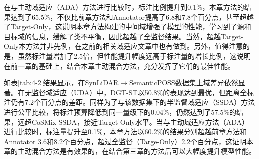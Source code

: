     在与主动域适应（ADA）方法进行比较时，标注比例提升到0.1\%，本章方法的结果达到了65.5\%，不仅比前章方法和Annotator提高了6.8和7.8个百分点，甚至超越了Target-Only，这说明本章方法构建的中间域增强了模型的性能，学习到了源和目标域的信息，缓解了类不平衡，因此超越了全监督结果。当然，超越Target-Only本方法并非先例，在之前的相关域适应文章中也有做到。另外，值得注意的是，虽然标注量增加了2.5倍，但性能提升幅度远高于标注量的增长比例，这说明在前一章的基础上，结合本章主动混合方法，充分发挥了它们的最佳性能。
    
    
    如表\ref{tab:4-2}结果显示，在SynLiDAR$\to$SemanticPOSS数据集上域差异依然显著。在无监督域适应（UDA）中，DGT-ST以50.8\%的表现达到最优，但距离全标注仍有7.2个百分点的差距。同样为了与该数据集下的半监督域适应（SSDA）方法进行公平比较，将标注预算降低到同一量级下的0.04\%，仍然达到了57.5\%的结果，远超CoSMix-SSDA，接近Target-Only水平。当与主动域适应方法（ADA）进行比较时，标注量提升至0.1\%，本章方法以60.2\%的结果分别超越前章方法和Annotator 3.6和8.2个百分点，超过全监督（Targe-Only）2.2个百分点，这证明本章的主动混合方法是有效果的，在结合第三章的方法后可以大幅度提升模型性能。
